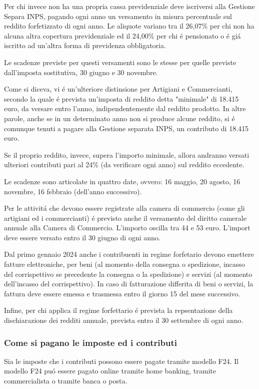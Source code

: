 \documentclass{article}
\begin{document}
Per chi invece non ha una propria cassa previdenziale deve iscriversi alla Gestione Separa INPS, pagando ogni anno un versamento in misura percentuale sul reddito forfetizzato di ogni anno.
Le aliquote variano tra il 26,07\% per chi non ha alcuna altra copertura previdenziale ed il 24,00\% per chi \'e pensionato o \'e gi\'a iscritto ad un'altra forma di previdenza obbligatoria.

Le scadenze previste per questi versamenti sono le stesse per quelle previste dall'imposta sostitutiva, 30 giugno e 30 novembre.

Come si diceva, vi \'e un'ulteriore distinsione per Artigiani e Commercianti, secondo la quale \'e prevista un'imposta di reddito detta "minimale" di 18.415 euro, da versare entro l'anno, indipendentemente dal reddito prodotto.
In altre parole, anche se in un determinato anno non si produce alcune reddito, si \'e comunque tenuti a pagare alla Gestione separata INPS, un contributo di 18.415 euro.

Se il proprio reddito, invece, supera l'importo minimale, allora andranno versati ulteriori contributi pari al 24\% (da verificare ogni anno) sul reddito eccedente.

Le scadenze sono articolate in quattro date, ovvero: 16 maggio, 20 agosto, 16 novembre, 16 febbraio (dell'anno successivo).

Per le attivit\'a che devono essere registrate alla camera di commercio (come gli artigiani ed i commercianti) \'e previsto anche il versamento del diritto camerale annuale alla Camera di Commercio. L'importo oscilla tra 44 e 53 euro. L'import deve essere versato entro il 30 giugno di ogni anno.

Dal primo gennaio 2024 anche i contribuenti in regime forfetario devono emettere fatture elettroniche, per beni (al momento della consegna o spedizione, incasso del corrispettivo se precedente la consegna o la spedizione)
e servizi (al momento dell'incasso del corrispettivo). In caso di fatturazione differita di beni o servizi, la fattura deve essere emessa e trasmessa entro il giorno 15 del mese successivo.

Infine, per chi applica il regime forfettario \'e prevista la repsentazione della dischiarazione dei redditi annuale, prevista entro il 30 settembre di ogni anno. 

\subsubsection{Come si pagano le imposte ed i contributi}
Sia le imposte che i contributi possono essere pagate tramite modello F24. 
Il modello F24 pu\'o essere pagato online tramite home banking, tramite commercialista o tramite banca o posta.
\end{document}

